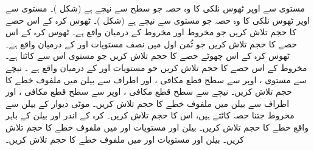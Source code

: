 مستوی  سے اوپر ٹھوس نلکی  کا وہ حصہ جو سطح  سے نیچے ہے (شکل )۔ 
مستوی  سے اوپر ٹھوس نلکی  کا وہ حصہ جو مستوی  سے نیچے ہے (شکل )۔ 
ٹھوس  کرہ  کے اس حصے کا حجم تلاش کریں جو  مخروط  اور مخروط   کے  درمیان  واقع    ہے۔
ٹھوس کرہ    کے  اس حصے  کا حجم تلاش کریں جو  ثُمن اول میں نصف مستویات  اور  کے درمیان واقع    ہے۔
ٹھوس کرہ  کے اس چھوٹے  حصے کا حجم تلاش کریں جو  مستوی  اس سے کاٹتا ہے۔
مخروط  کے اس  حصے کا حجم تلاش کریں جو  مستویات  اور  کے درمیان واقع ہے  ۔
نیچے سے مستوی ، اوپر سے سطح قطع مکافی ،  اور اطراف سے بیلن  میں ملفوف خطے کا حجم تلاش کریں۔
نیچے سے سطح قطع مکافی  ، اوپر سے سطح قطع مکافی  ، اور اطراف سے بیلن  میں ملفوف خطے کا حجم تلاش کریں۔
موٹی  دیوار کے بیلن   سے مخروط   جتنا حصہ کاٹتے ہیں، اس کا حجم تلاش کریں۔
کرہ  کے اندر اور بیلن  کے باہر  واقع خطے کا حجم تلاش کریں۔
بیلن  اور مستویات  اور  میں ملفوف خطے کا حجم تلاش کریں۔
\wf{\unexpanded{
\(16\pi\)
}}
بیلن  اور مستویات  اور  میں ملفوف خطے کا حجم تلاش کریں۔
